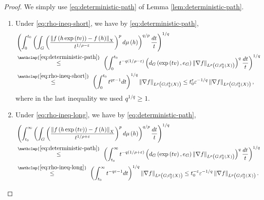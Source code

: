 \documentclass[11pt,reqno]{amsart}
\newcommand{\1}{\mathbf 1}
\begin{document}
\begin{proof}
We simply use \eqref{eq:deterministic-path} of Lemma  \ref{lem:deterministic-path}.
\begin{enumerate}
    \item Under \eqref{eq:rho-ineq-short}, we have by \eqref{eq:deterministic-path},
    \begin{align*}
&\left(\int_0^{t_0} \left(\int_{G}\left(\frac{\left\|f\left(h\exp\left(tv\right)\right)-f\left(h\right)\right\|_X}{t^{1/\rho-\varepsilon}}\right)^pd\mu\left(h\right)\right)^{q/p}\frac{dt}{t}\right)^{1/q}\\
&\stackrel{\mathclap{\eqref{eq:deterministic-path}}}{\le} ~\left(\int_0^{t_0} t^{-q\left(1/\rho-\varepsilon\right)}\left(d_G\left(\exp\left(tv\right),e_G\right)  \left\|\nabla f\right\|_{L^p\left(G;\ell_2^k(X)\right)}\right)^{q}\frac{dt}{t}\right)^{1/q}\\
&\stackrel{\mathclap{\eqref{eq:rho-ineq-short}}}{\le} ~\left(\int_0^{t_0} t^{q\varepsilon-1}dt\right)^{1/q}\left\|\nabla f\right\|_{L^p\left(G;\ell_2^k(X)\right)}\le t_0^\varepsilon\varepsilon^{-1/q}\left\|\nabla f\right\|_{L^p\left(G;\ell_2^k(X)\right)},
\end{align*}
where in the last inequality we used $q^{1/q}\ge 1$.
    \item Under \eqref{eq:rho-ineq-long}, we have by \eqref{eq:deterministic-path},
    \begin{align*}
&\left(\int_{t_0}^\infty \left(\int_{G}\left(\frac{\left\|f\left(h\exp\left(tv\right)\right)-f\left(h\right)\right\|_X}{t^{1/\rho+\varepsilon}}\right)^pd\mu\left(h\right)\right)^{q/p}\frac{dt}{t}\right)^{1/q}\\
&\stackrel{\mathclap{\eqref{eq:deterministic-path}}}{\le} ~\left(\int_{t_0}^\infty t^{-q\left(1/\rho+\varepsilon\right)}\left(d_G\left(\exp\left(tv\right),e_G\right)  \left\|\nabla f\right\|_{L^p\left(G;\ell_2^k(X)\right)}\right)^{q}\frac{dt}{t}\right)^{1/q}\\
&\stackrel{\mathclap{\eqref{eq:rho-ineq-long}}}{\le} ~\left(\int_{t_0}^\infty t^{-q\varepsilon-1}dt\right)^{1/q}\left\|\nabla f\right\|_{L^p\left(G;\ell_2^k(X)\right)}\le t_0^{-\varepsilon}\varepsilon^{-1/q}\left\|\nabla f\right\|_{L^p\left(G;\ell_2^k(X)\right)}.
\end{align*}
\end{enumerate}
\end{proof}
\end{document}
